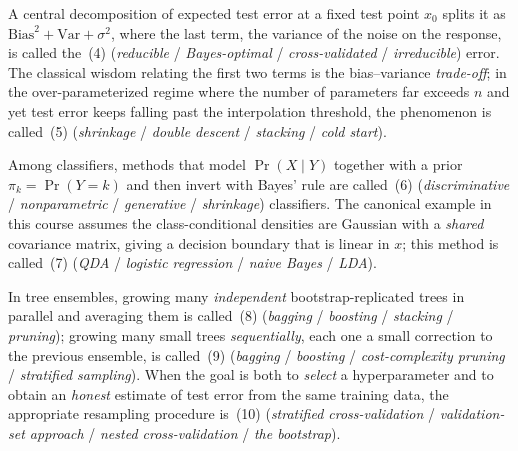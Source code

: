\documentclass[11pt,a4paper]{article}
\begin{document}
A central decomposition of expected test error at a fixed test point $x_0$ splits it as $\mathrm{Bias}^2 + \mathrm{Var} + \sigma^2$, where the last term, the variance of the noise on the response, is called the \underline{\hspace{2.5cm}}\,(4) (\emph{reducible} / \emph{Bayes-optimal} / \emph{cross-validated} / \emph{irreducible}) error. The classical wisdom relating the first two terms is the bias--variance \emph{trade-off}; in the over-parameterized regime where the number of parameters far exceeds $n$ and yet test error keeps falling past the interpolation threshold, the phenomenon is called \underline{\hspace{2.5cm}}\,(5) (\emph{shrinkage} / \emph{double descent} / \emph{stacking} / \emph{cold start}).

Among classifiers, methods that model $\Pr(X \mid Y)$ together with a prior $\pi_k = \Pr(Y = k)$ and then invert with Bayes' rule are called \underline{\hspace{2.5cm}}\,(6) (\emph{discriminative} / \emph{nonparametric} / \emph{generative} / \emph{shrinkage}) classifiers. The canonical example in this course assumes the class-conditional densities are Gaussian with a \emph{shared} covariance matrix, giving a decision boundary that is linear in $x$; this method is called \underline{\hspace{2.5cm}}\,(7) (\emph{QDA} / \emph{logistic regression} / \emph{naive Bayes} / \emph{LDA}).

In tree ensembles, growing many \emph{independent} bootstrap-replicated trees in parallel and averaging them is called \underline{\hspace{2.5cm}}\,(8) (\emph{bagging} / \emph{boosting} / \emph{stacking} / \emph{pruning}); growing many small trees \emph{sequentially}, each one a small correction to the previous ensemble, is called \underline{\hspace{2.5cm}}\,(9) (\emph{bagging} / \emph{boosting} / \emph{cost-complexity pruning} / \emph{stratified sampling}). When the goal is both to \emph{select} a hyperparameter and to obtain an \emph{honest} estimate of test error from the same training data, the appropriate resampling procedure is \underline{\hspace{2.5cm}}\,(10) (\emph{stratified cross-validation} / \emph{validation-set approach} / \emph{nested cross-validation} / \emph{the bootstrap}).

\vfill\eject

\end{document}

